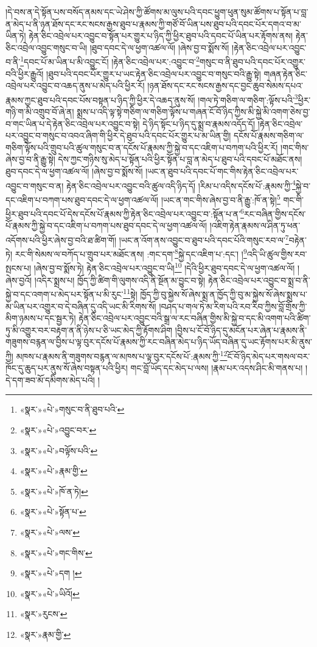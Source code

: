 །དེ་བས་ན་དེ་སྟོན་པས་བསོད་ནམས་དང་ཡེ་ཤེས་ཀྱི་ཚོགས་མ་ལུས་པའི་དབང་ཕྱུག་ཕུན་སུམ་ཚོགས་པ་སྟོན་པ་བླ་ན་མེད་པ་ནི་ཉན་ཐོས་དང་རང་སངས་རྒྱས་ཐུབ་པ་རྣམས་ཀྱི་གཙོ་བོ་ཡིན་པས་ཐུབ་པའི་དབང་པོར་དགའ་བ་མ་ཡིན་ཏེ། རྟེན་ཅིང་འབྲེལ་པར་འབྱུང་བ་སྟོན་པར་གྱུར་པ་ཉིད་ཀྱི་ཕྱིར་ཐུབ་པའི་དབང་པོ་ཡིན་པར་རྟོགས་ནས། རྟེན་ཅིང་འབྲེལ་འབྱུང་གསུང་བ་ཡི། །ཐུབ་དབང་དེ་ལ་ཕྱག་འཚལ་ལོ། །ཞེས་བྱ་བ་སྨོས་སོ། །རྟེན་ཅིང་འབྲེལ་པར་འབྱུང་བ་ནི་\footnote{«སྣར་»«པེ་»གསུང་བ་ནི་ཐུབ་པའི་}དབང་པོ་མ་ཡིན་པ་མི་འབྱུང་ངོ། །རྟེན་ཅིང་འབྲེལ་པར་:འབྱུང་བ་\footnote{«སྣར་»«པེ་»འབྱུང་བར་}གསུང་བ་ནི་ཐུབ་པའི་དབང་པོར་འགྱུར་བའི་ཕྱིར་རྒྱུའོ། །ཐུབ་པའི་དབང་པོར་གྱུར་པ་ཡང་རྟེན་ཅིང་འབྲེལ་པར་འབྱུང་བ་གསུང་བའི་རྒྱུ་སྟེ། གཞན་རྟེན་ཅིང་འབྲེལ་པར་འབྱུང་བ་འཆད་ནུས་པ་མེད་པའི་ཕྱིར་རོ། །ཉན་ཐོས་དང་རང་སངས་རྒྱས་དང་བྱང་ཆུབ་སེམས་དཔའ་རྣམས་ཀྱང་ཐུབ་པའི་དབང་པོས་བསྟན་པ་ཉིད་ཀྱི་ཕྱིར་དེ་འཆད་ནུས་སོ། །གལ་ཏེ་གཅིག་ལ་གཅིག་:ལྟོས་པའི་\footnote{«སྣར་»«པེ་»བལྟོས་པའི་}ཕྱིར་གཉི་ག་མི་འགྲུབ་བོ་ཞེ་ན། སྨྲས་པ་འདི་ལྟ་སྟེ་གཅིག་ལ་གཅིག་ལྟོས་པ་གཞན་ངོ་བོ་ཉིད་ཀྱིས་མི་སྐྱེ་མི་འགག་ཅེས་བྱ་བ་གང་ཡིན་པ་དེ་རྟེན་ཅིང་འབྲེལ་པར་འབྱུང་བ་སྟེ། དེ་ཉིད་སྟོང་པ་ཉིད་དུ་སྨྲ་བ་རྣམས་འདོད་དོ། །རྟེན་ཅིང་འབྲེལ་པར་འབྱུང་བ་གསུང་བ་འབའ་ཞིག་གི་ཕྱིར་དེ་ཐུབ་པའི་དབང་པོར་གྱུར་པ་མ་ཡིན་གྱི། དངོས་པོ་རྣམས་གཅིག་ལ་གཅིག་ལྟོས་པའི་གྲུབ་པའི་ཚུལ་གསུང་བ་ན་དངོས་པོ་རྣམས་ཀྱི་སྐྱེ་བ་དང་འཇིག་པ་བཀག་པའི་ཕྱིར་རོ། །གང་གིས་ཞེས་བྱ་བ་ནི་རྒྱུ་སྟེ། དེས་ཀྱང་གཉིས་སུ་མེད་པ་སྟོན་པའི་ཕྱིར་སྟོན་པ་བླ་ན་མེད་པ་ཐུབ་པའི་དབང་པོ་མཐོང་ནས། ཐུབ་དབང་དེ་ལ་ཕྱག་འཚལ་ལོ། །ཞེས་བྱ་བ་སྨོས་སོ། །ཡང་ན་ཐུབ་པའི་དབང་པོ་གང་གིས་རྟེན་ཅིང་འབྲེལ་པར་འབྱུང་བ་གསུང་བ་ན། རྟེན་ཅིང་འབྲེལ་པར་འབྱུང་བའི་ཚུལ་འདི་ཉིད་དོ། །རིམ་པ་འདིས་དངོས་པོ་:རྣམས་ཀྱི་\footnote{«སྣར་»«པེ་»རྣམ་གྱི་}སྐྱེ་བ་དང་འཇིག་པ་བཀག་པས་ཐུབ་དབང་དེ་ལ་ཕྱག་འཚལ་ལོ། །ཡང་ན་གང་གིས་ཞེས་བྱ་བ་ནི་རྒྱུ་:ཁོ་ན་སྟེ།\footnote{«སྣར་»«པེ་»ཁོ་ན་ཏེ།} གང་གི་ཕྱིར་ཐུབ་པའི་དབང་པོ་དེས་དངོས་པོ་རྣམས་ཀྱི་རྟེན་ཅིང་འབྲེལ་པར་འབྱུང་བ་:སྟོན་པ་ན་\footnote{«སྣར་»«པེ་»སྟོན་པ་}རང་བཞིན་གྱིས་དངོས་པོ་རྣམས་ཀྱི་སྐྱེ་བ་དང་འཇིག་པ་བཀག་པས་ཐུབ་དབང་དེ་ལ་ཕྱག་འཚལ་ལོ། །འཇིག་རྟེན་རྣམས་ལ་ཤིན་ཏུ་ཕན་འདོགས་པའི་ཕྱིར་ཞེས་བྱ་བའི་ཐ་ཚིག་གོ། །ཡང་ན་འོག་ནས་འབྱུང་བ་ཐུབ་པའི་དབང་པོའི་གསུང་རབ་ལ་\footnote{«སྣར་»«པེ་»ལས་}བརྟེན་ཏེ། རང་གི་སེམས་ལ་བཀོད་པ་གྲུབ་པར་མཐོང་ནས། :གང་དག་\footnote{«སྣར་»«པེ་»གང་གིས་}སྐྱེ་དང་འཇིག་པ་:དང་། །\footnote{«སྣར་»«པེ་»དག །}འདི་ཡི་ཚུལ་གྱིས་རབ་སྤངས་པ། །ཞེས་བྱ་བ་སྨོས་ཏེ། རྟེན་ཅིང་འབྲེལ་པར་འབྱུང་བ་ཡི།\footnote{«སྣར་»«པེ་»ཡིའོ།} །དེའི་ཕྱིར་ཐུབ་དབང་དེ་ལ་ཕྱག་འཚལ་ལོ། །ཞེས་བྱའོ། །འདིར་སྨྲས་པ། ཁྱོད་ཀྱི་ཚིག་གི་ལུགས་འདི་ནི་སྔོན་མ་བྱུང་བ་སྟེ། རྟེན་ཅིང་འབྲེལ་པར་འབྱུང་བ་སྨྲ་བ་ནི་སྐྱེ་བ་དང་འགག་པ་མེད་པར་སྟོན་པ་མི་རུང་\footnote{«སྣར་»རུངས་}སྟེ། ཁྱོད་ཀྱི་བུ་སྐྱེས་སོ་ཞེས་སྨྲ་ན་ཁྱོད་ཀྱི་བུ་མ་སྐྱེས་སོ་ཞེས་སྨྲས་པ་མ་ཡིན་པར་འགྱུར་བ་དེ་བཞིན་དུ་འདི་ཡང་མི་རིགས་སོ། །བཤད་པ་གལ་ཏེ་མ་རིག་པའི་རབ་རིབ་ཀྱིས་བློ་གྲོས་ཀྱི་མིག་ཉམས་པ་དང་སྦྱར་ཏེ། རྟེན་ཅིང་འབྲེལ་པར་འབྱུང་བའི་སྒྲ་ལ་རང་བཞིན་གྱིས་མི་སྐྱེ་བ་དང་མི་འགག་པའི་ཚིག་ཏུ་མི་འགྱུར་བར་བརྟག་ན་ནི་ཉེས་པ་ཅི་ཡང་མེད་ཀྱི་རྟོགས་ཤིག །བྱིས་པ་ངོ་བོ་ཉིད་དུ་མངོན་པར་ཞེན་པ་རྣམས་ནི་གཟུགས་བརྙན་ལ་བྱིས་པ་ལྟ་བུར་དངོས་པོ་རྣམས་ཀྱི་རང་བཞིན་མེད་པ་ཉིད་ཡོད་བཞིན་དུ་ཡང་རྟོགས་པར་མི་ནུས་ཀྱི། མཁས་པ་རྣམས་ནི་གཟུགས་བརྙན་ལ་མཁས་པ་ལྟ་བུར་དངོས་པོ་:རྣམས་ཀྱི་\footnote{«སྣར་»རྣམ་གྱི་}ངོ་བོ་ཉིད་མེད་པར་གསལ་བར་ཁོང་དུ་ཆུད་པར་ནུས་སོ་ཞེས་བསྟན་པའི་ཕྱིར། གང་བློ་ཡོད་དང་མེད་པ་ལས། །རྣམ་པར་འདས་ཤིང་མི་གནས་པ། །དེ་དག་ཟབ་མོ་དམིགས་མེད་པའི། །
